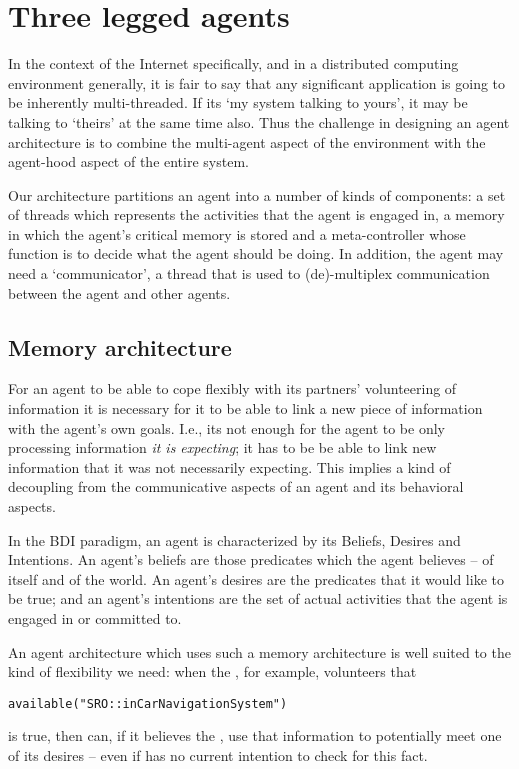 \chapter{Three legged agents}
\label{agent}

In the context of the Internet specifically, and in a distributed computing environment generally, it is fair to say that any significant application is going to be inherently multi-threaded. If its `my system talking to yours', it may be talking to `theirs' at the same time also. Thus the challenge in designing an agent architecture is to combine the multi-agent aspect of the environment with the agent-hood aspect of the entire system.

Our architecture partitions an agent into a number of kinds of components: a set of threads which represents the activities that the agent is engaged in, a memory in which the agent's critical memory is stored and a meta-controller whose function is to decide what the agent should be doing. In addition, the agent may need a `communicator', a thread that is used to (de)-multiplex communication between the agent and other agents.


\section{Memory architecture}

For an agent to be able to cope flexibly with its partners' volunteering of information it is necessary for it to be able to link a new piece of information with the agent's own goals. I.e., its not enough for the agent to be only processing information \emph{it is expecting}; it has to be be able to link new information that it was not necessarily expecting. This implies a kind of decoupling from the communicative aspects of an agent and its behavioral aspects.

In the BDI paradigm, an agent is characterized by its Beliefs, Desires and Intentions. An agent's beliefs are those predicates which the agent believes -- of itself and of the world. An agent's desires are the predicates that it would like to be true; and an agent's intentions are the set of actual activities that the agent is engaged in or committed to.

An agent architecture which uses such a memory architecture is well suited to the kind of flexibility we need: when the , for example, volunteers that 
\begin{alltt}
available("SRO::inCarNavigationSystem")
\end{alltt}
is true, then  can, if it believes the , use that information to potentially meet one of its desires -- even if  has no current intention to check for this fact. 

